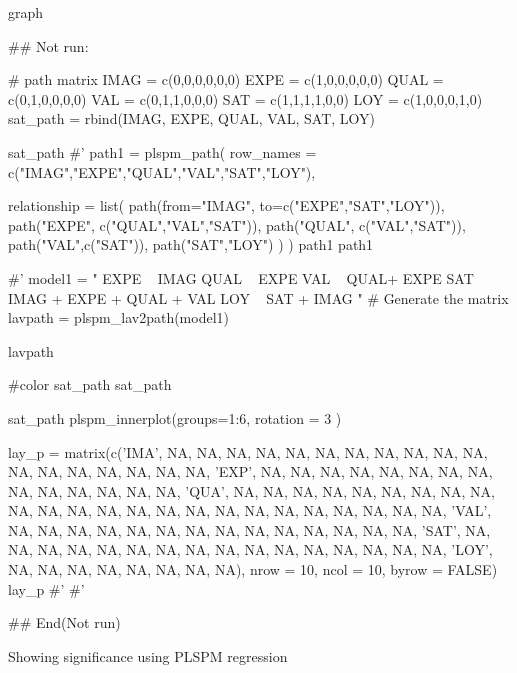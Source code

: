 \documentclass[a4paper]{book}
\begin{document}
%
\begin{Value}
graph
\end{Value}
%
\begin{Examples}
\begin{ExampleCode}

\#\# Not run: 

# path matrix
IMAG = c(0,0,0,0,0,0)
EXPE = c(1,0,0,0,0,0)
QUAL = c(0,1,0,0,0,0)
VAL = c(0,1,1,0,0,0)
SAT = c(1,1,1,1,0,0)
LOY = c(1,0,0,0,1,0)
sat_path = rbind(IMAG, EXPE, QUAL, VAL, SAT, LOY)

sat_path%
#'
path1 = plspm_path(
  row_names = c("IMAG","EXPE","QUAL","VAL","SAT","LOY"),

  relationship = list(
    path(from="IMAG", to=c("EXPE","SAT","LOY")),
    path("EXPE", c("QUAL","VAL","SAT")),
    path("QUAL", c("VAL","SAT")),
    path("VAL",c("SAT")),
    path("SAT","LOY")
  )
)
path1
path1%

#'
model1 = "
EXPE ~ IMAG
QUAL ~ EXPE
VAL ~  QUAL+ EXPE
SAT ~ IMAG + EXPE + QUAL + VAL
LOY ~ SAT + IMAG
"
# Generate the matrix
lavpath = plspm_lav2path(model1)


lavpath%

#color
sat_path %
sat_path %


sat_path %
 plspm_innerplot(groups=1:6, rotation = 3 )


lay_p = matrix(c('IMA', NA, NA, NA, NA, NA, NA, NA,
                 NA, NA, NA, NA, NA, NA, NA, NA, NA, NA, NA, 'EXP', NA,
                 NA, NA, NA, NA, NA, NA, NA, NA, NA, NA, NA, NA, NA, 'QUA',
                 NA, NA, NA, NA, NA, NA, NA, NA, NA, NA, NA, NA, NA, NA, NA,
                 NA, NA, NA, NA, NA, NA, NA, NA, NA, 'VAL', NA, NA, NA, NA,
                 NA, NA, NA, NA, NA, NA, NA, NA, NA, NA, 'SAT', NA, NA, NA,
                 NA, NA, NA, NA, NA, NA, NA, NA, NA, NA, NA, NA, NA, 'LOY',
                 NA, NA, NA, NA, NA, NA, NA, NA),
               nrow = 10, ncol = 10, byrow = FALSE)
lay_p
#'
#'

## End(Not run)


\end{ExampleCode}
\end{Examples}
%
\begin{Description}
Showing significance using PLSPM regression
\end{Description}
\end{document}
